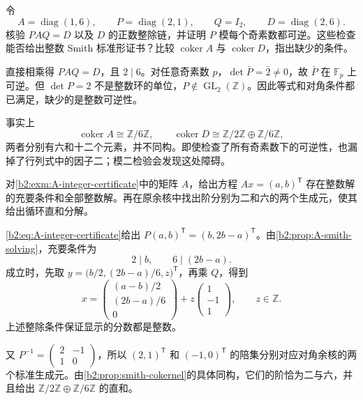 \begin{exercise}\label{b2:ex:A-wrong-diagonal}
	令
	\[
		A=\operatorname{diag}(1,6),\qquad P=\operatorname{diag}(2,1), \qquad Q=I_2,\qquad D=\operatorname{diag}(2,6).
	\]
	核验 \(PAQ=D\) 以及 \(D\) 的正数整除链，并证明 \(P\) 模每个奇素数都可逆。这些检查能否给出整数 Smith 标准形证书？比较 \(\operatorname{coker}A\) 与 \(\operatorname{coker}D\)，指出缺少的条件。
\end{exercise}
\begin{solution}
	直接相乘得 \(PAQ=D\)，且 \(2\mid6\)。对任意奇素数 \(p\)，\(\det\bar P=\bar2\ne0\)，故 \(\bar P\) 在 \(\mathbb F_p\) 上可逆。但 \(\det P=2\) 不是整数环的单位，\(P\notin\operatorname{GL}_2(\mathbb Z)\)。因此等式和对角条件都已满足，缺少的是整数可逆性。

	事实上
	\[
		\operatorname{coker}A\cong\mathbb Z/6\mathbb Z, \qquad \operatorname{coker}D\cong\mathbb Z/2\mathbb Z\oplus\mathbb Z/6\mathbb Z,
	\]
	两者分别有六和十二个元素，并不同构。即使检查了所有奇素数下的可逆性，也漏掉了行列式中的因子二；模二检验会发现这处障碍。
\end{solution}

\begin{exercise}\label{b2:ex:A-original-coordinates}
	对\cref{b2:exm:A-integer-certificate}中的矩阵 \(A\)，给出方程 \(Ax=(a,b)^{\mathsf T}\) 存在整数解的充要条件和全部整数解。再在原余核中找出阶分别为二和六的两个生成元，使其给出循环直和分解。
\end{exercise}
\begin{solution}
	\eqref{b2:eq:A-integer-certificate}给出 \(P(a,b)^{\mathsf T}=(b,2b-a)^{\mathsf T}\)。由\cref{b2:prop:A-smith-solving}，充要条件为
	\[
		2\mid b,\qquad6\mid(2b-a).
	\]
	成立时，先取 \(y=\bigl(b/2,(2b-a)/6,z\bigr)^{\mathsf T}\)，再乘 \(Q\)，得到
	\[
		x=\begin{pmatrix}(a-b)/2\\(2b-a)/6\\0\end{pmatrix}
		+z\begin{pmatrix}1\\-1\\1\end{pmatrix},\qquad z\in\mathbb Z.
	\]
	上述整除条件保证显示的分数都是整数。

	又 \(P^{-1}=\begin{pmatrix}2&-1\\1&0\end{pmatrix}\)，所以 \((2,1)^{\mathsf T}\) 和 \((-1,0)^{\mathsf T}\) 的陪集分别对应对角余核的两个标准生成元。由\cref{b2:prop:smith-cokernel}的具体同构，它们的阶恰为二与六，并且给出 \(\mathbb Z/2\mathbb Z\oplus\mathbb Z/6\mathbb Z\) 的直和。
\end{solution}

